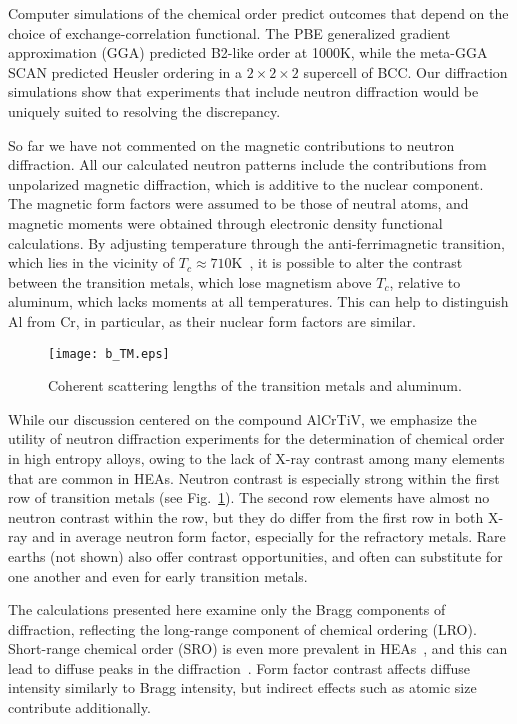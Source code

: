 \documentclass[twoside,12pt]{article}
\begin{document}
Computer simulations of the chemical order predict outcomes that depend on the choice of exchange-correlation functional. The PBE generalized gradient approximation (GGA) predicted B2-like order at 1000K, while the meta-GGA SCAN predicted Heusler ordering in a $2\times 2\times 2$ supercell of BCC. Our diffraction simulations show that experiments that include neutron diffraction would be uniquely suited to resolving the discrepancy.

So far we have not commented on the magnetic contributions to neutron diffraction. All our calculated neutron patterns include the contributions from unpolarized magnetic diffraction, which is additive to the nuclear component. The magnetic form factors were assumed to be those of neutral atoms, and magnetic moments were obtained through electronic density functional calculations. By adjusting temperature through the anti-ferrimagnetic transition, which lies in the vicinity of $T_c\approx 710$K~\cite{Venkat2018}, it is possible to alter the contrast between the transition metals, which lose magnetism above $T_c$, relative to aluminum, which lacks moments at all temperatures. This can help to distinguish Al from Cr, in particular, as their nuclear form factors are similar.


\begin{figure}[h!]
  \centering
\texttt{[image: b\_TM.eps]}
  \caption{\label{fig:b_coh} Coherent scattering lengths of the transition metals and aluminum.}
\end{figure}

While our discussion centered on the compound AlCrTiV, we emphasize the utility of neutron diffraction experiments for the determination of chemical order in high entropy alloys, owing to the lack of X-ray contrast among many elements that are common in HEAs. Neutron contrast is especially strong within the first row of transition metals (see Fig.~\ref{fig:b_coh}). The second row elements have almost no neutron contrast within the row, but they do differ from the first row in both X-ray and in average neutron form factor, especially for the refractory metals. Rare earths (not shown) also offer contrast opportunities, and often can substitute for one another and even for early transition metals.

The calculations presented here examine only the Bragg components of diffraction, reflecting the long-range component of chemical ordering (LRO). Short-range chemical order (SRO) is even more prevalent in HEAs~\cite{Huhn13,Ritchie2021,Woodgate2024}, and this can lead to diffuse peaks in the diffraction~\cite{Krivoglaz96,Schweika98,Widom16,Ziehl,Foley}. Form factor contrast affects diffuse intensity similarly to Bragg intensity, but indirect effects such as atomic size contribute additionally.
\end{document}
